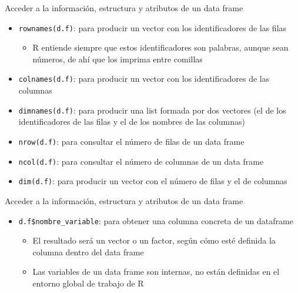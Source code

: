 \documentclass[
  ignorenonframetext,
]{beamer}
\providecommand{\tightlist}{%
  \setlength{\itemsep}{0pt}\setlength{\parskip}{0pt}}
\begin{document}
\begin{frame}[fragile]{Acceder a la información, estructura y atributos
de un data frame}
\label{acceder-a-la-informaciuxf3n-estructura-y-atributos-de-un-data-frame-3}
\begin{itemize}
\tightlist
\item
  \texttt{rownames(d.f)}: para producir un vector con los
  identificadores de las filas

  \begin{itemize}
  \tightlist
  \item
    R entiende siempre que estos identificadores son palabras, aunque
    sean números, de ahí que los imprima entre comillas
  \end{itemize}
\item
  \texttt{colnames(d.f)}: para producir un vector con los
  identificadores de las columnas
\item
  \texttt{dimnames(d.f)}: para producir una list formada por dos
  vectores (el de los identificadores de las filas y el de los nombres
  de las columnas)
\item
  \texttt{nrow(d.f)}: para consultar el número de filas de un data frame
\item
  \texttt{ncol(d.f)}: para consultar el número de columnas de un data
  frame
\item
  \texttt{dim(d.f)}: para producir un vector con el número de filas y el
  de columnas
\end{itemize}
\end{frame}

\begin{frame}[fragile]{Acceder a la información, estructura y atributos
de un data frame}
\label{acceder-a-la-informaciuxf3n-estructura-y-atributos-de-un-data-frame-4}
\begin{itemize}
\tightlist
\item
  \texttt{d.f\$nombre\_variable}: para obtener una columna concreta de
  un dataframe

  \begin{itemize}
  \tightlist
  \item
    El resultado será un vector o un factor, según cómo esté definida la
    columna dentro del data frame
  \item
    Las variables de un data frame son internas, no están definidas en
    el entorno global de trabajo de R
  \end{itemize}
\end{itemize}
\end{frame}
\end{document}
